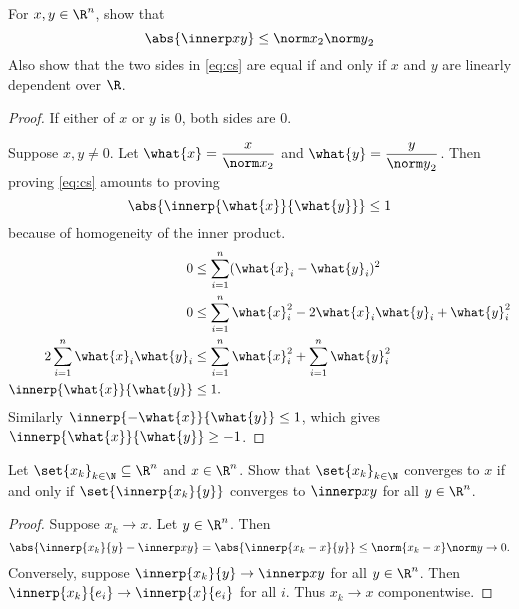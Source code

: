 \documentclass[12pt]{article}
\begin{document}
\begin{problem}
    For $x, y \in \R^n$, show that \begin{equation}
        \abs{\innerp xy} \le {\norm x}_2 {\norm y}_2 \label{eq:cs}
    \end{equation}
    Also show that the two sides in \cref{eq:cs} are equal if and only if
    $x$ and $y$ are linearly dependent over $\R$.
\end{problem}
\begin{proof}
    If either of $x$ or $y$ is $0$, both sides are $0$.

    Suppose $x, y \ne 0$.
    Let $\what{x} = \dfrac{x}{{\norm x}_2}$ and
    $\what{y} = \dfrac{y}{{\norm y}_2}$.
    Then proving \cref{eq:cs} amounts to proving \[
        \abs{\innerp{\what{x}}{\what{y}}} \le 1
    \] because of homogeneity of the inner product.
    \begin{align*}
        0 &\le \sum_{i=1}^n (\what{x}_i - \what{y}_i)^2 \\
        0 &\le \sum_{i=1}^n \what{x}_i^2 - 2\what{x}_i\what{y}_i + \what{y}_i^2 \\
        2\sum_{i=1}^n \what{x}_i\what{y}_i &\le \sum_{i=1}^n \what{x}_i^2 + \sum_{i=1}^n \what{y}_i^2 \\
        \innerp{\what{x}}{\what{y}} &\le 1.
    \end{align*}
    Similarly $\innerp{-\what{x}}{\what{y}} \le 1$, which gives
    $\innerp{\what{x}}{\what{y}} \ge -1$.
\end{proof}

\begin{problem}
    Let $\set{x_k}_{k \in \N} \subseteq \R^n$ and $x \in \R^n$.
    Show that $\set{x_k}_{k \in \N}$ converges to $x$ if and only if
    $\set{\innerp{x_k}{y}}$ converges to $\innerp xy$ for all $y \in \R^n$.
\end{problem}
\begin{proof}
    Suppose $x_k \to x$.
    Let $y \in \R^n$.
    Then
    \[
        \abs{\innerp{x_k}{y} - \innerp xy}
            = \abs{\innerp{x_k - x}{y}}
            \le \norm{x_k - x} \norm y
            \to 0.
    \]
    Conversely, suppose
    $\innerp{x_k}{y} \to \innerp xy$ for all
    $y \in \R^n$.
    Then $\innerp{x_k}{e_i} \to \innerp{x}{e_i}$ for all $i$.
    Thus $x_k \to x$ componentwise.
\end{proof}
\end{document}
